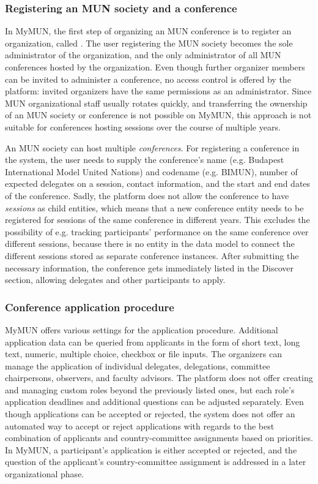 \subsubsection{Registering an MUN society and a conference}

In MyMUN, the first step of organizing an MUN conference is to register an organization, called . The user registering the MUN society becomes the sole administrator of the organization, and the only administrator of all MUN conferences hosted by the organization. Even though further organizer members can be invited to administer a conference, no access control is offered by the platform: invited organizers have the same permissions as an administrator. Since MUN organizational staff usually rotates quickly, and transferring the ownership of an MUN society or conference is not possible on MyMUN, this approach is not suitable for conferences hosting sessions over the course of multiple years.

An MUN society can host multiple \emph{conferences}. For registering a conference in the system, the user needs to supply the conference's name (e.g. Budapest International Model United Nations) and codename (e.g. BIMUN), number of expected delegates on a session, contact information, and the start and end dates of the conference. Sadly, the platform does not allow the conference to have \emph{sessions} as child entities, which means that a new conference entity needs to be registered for sessions of the same conference in different years. This excludes the possibility of e.g. tracking participants' performance on the same conference over different sessions, because there is no entity in the data model to connect the different sessions stored as separate conference instances. After submitting the necessary information, the conference gets immediately listed in the Discover section, allowing delegates and other participants to apply.

\subsubsection{Conference application procedure}

MyMUN offers various settings for the application procedure. Additional application data can be queried from applicants in the form of short text, long text, numeric, multiple choice, checkbox or file inputs. The organizers can manage the application of individual delegates, delegations, committee chairpersons, observers, and faculty advisors. The platform does not offer creating and managing custom roles beyond the previously listed ones, but each role's application deadlines and additional questions can be adjusted separately. Even though applications can be accepted or rejected, the system does not offer an automated way to accept or reject applications with regards to the best combination of applicants and country-committee assignments based on priorities. In MyMUN, a participant's application is either accepted or rejected, and the question of the applicant's country-committee assignment is addressed in a later organizational phase.

